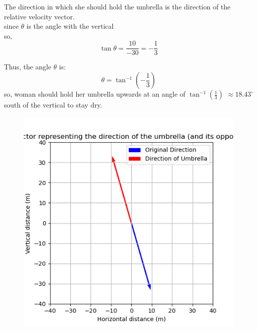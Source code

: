 \documentclass[journal]{IEEEtran}
\begin{document}
The direction in which she should hold the umbrella is the direction of the relative velocity vector. \\
since $\theta$ is the angle with the vertical \\so,
\[
\tan \theta =  \frac{10}{-30} = -\frac{1}{3}
\]

Thus, the angle \( \theta \) is:
\[
\theta = \tan^{-1}(-\frac{1}{3})
\]
  so, woman should hold her umbrella upwards at an angle of $\tan^{-1}(\frac{1}{3})$ \( \approx 18.43^\circ \)south of the vertical to stay dry.
  
  \begin{figure}[h]
        \centering
       \includegraphics[width=0.7\linewidth]{figs/fig1.png}
       \caption{}
       \label{graph}
    \end{figure}
\end{document}
